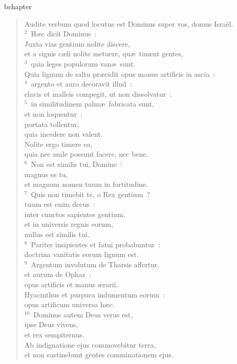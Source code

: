 bchapter\begin{flushleft}\begin{verse}\vspace{-19pt}\hspace{6pt}Audite verbum quod locutus est Dominus super vos, domus Isra\"el.\\\hspace{6pt}
${}^{2}$~H\ae c dicit Dominus~:\\ Juxta vias gentium nolite discere,\\ et a signis c\ae li nolite metuere, qu\ae\ timent gentes,\\
${}^{3}$~quia leges populorum van\ae\ sunt.\\ Quia lignum de saltu pr\ae cidit opus manus artificis in ascia~:\\
${}^{4}$~argento et auro decoravit illud~:\\ clavis et malleis compegit, ut non dissolvatur~:\\
${}^{5}$~in similitudinem palm\ae\ fabricata sunt,\\ et non loquentur~:\\ portata tollentur,\\ quia incedere non valent.\\ Nolite ergo timere ea,\\ quia nec male possunt facere, nec bene.\\
${}^{6}$~Non est similis tui, Domine~:\\ magnus es tu,\\ et magnum nomen tuum in fortitudine.\\
${}^{7}$~Quis non timebit te, o Rex gentium~?\\ tuum est enim decus~:\\ inter cunctos sapientes gentium,\\ et in universis regnis eorum,\\ nullus est similis tui.\\
${}^{8}$~Pariter insipientes et fatui probabuntur~:\\ doctrina vanitatis eorum lignum est.\\
${}^{9}$~Argentum involutum de Tharsis affertur,\\ et aurum de Ophaz~:\\ opus artificis et manus \ae rarii.\\ Hyacinthus et purpura indumentum eorum~:\\ opus artificum universa h\ae c.\\
${}^{10}$~Dominus autem Deus verus est,\\ ipse Deus vivens,\\ et rex sempiternus.\\ Ab indignatione ejus commovebitur terra,\\ et non sustinebunt gentes comminationem ejus.\\

\end{verse}
\end{flushleft}
